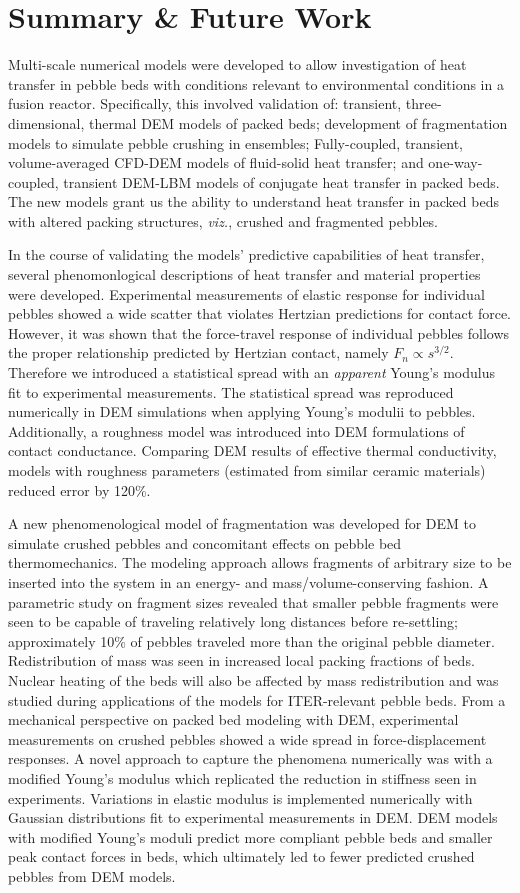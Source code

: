 \chapter{Summary \& Future Work}\label{sec:summary}
Multi-scale numerical models were developed to allow investigation of heat transfer in pebble beds with conditions relevant to environmental conditions in a fusion reactor. Specifically, this involved validation of: transient, three-dimensional, thermal DEM models of packed beds; development of fragmentation models to simulate pebble crushing in ensembles; Fully-coupled, transient, volume-averaged CFD-DEM models of fluid-solid heat transfer; and one-way-coupled, transient DEM-LBM models of conjugate heat transfer in packed beds. The new models grant us the ability to understand heat transfer in packed beds with altered packing structures, \textit{viz.}, crushed and fragmented pebbles. 

In the course of validating the models' predictive capabilities of heat transfer, several phenomonlogical descriptions of heat transfer and material properties were developed. Experimental measurements of elastic response for individual pebbles showed a wide scatter that violates Hertzian predictions for contact force. However, it was shown that the force-travel response of individual pebbles follows the proper relationship predicted by Hertzian contact, namely $F_n \propto s^{3/2}$. Therefore we introduced a statistical spread with an \textit{apparent} Young's modulus fit to experimental measurements. The statistical spread was reproduced numerically in DEM simulations when applying Young's modulii to pebbles. Additionally, a roughness model was introduced into DEM formulations of contact conductance. Comparing DEM results of effective thermal conductivity, models with roughness parameters (estimated from similar ceramic materials) reduced error by 120\%. 

A new phenomenological model of fragmentation was developed for DEM to simulate crushed pebbles and concomitant effects on pebble bed thermomechanics. The modeling approach allows fragments of arbitrary size to be inserted into the system in an energy- and mass/volume-conserving fashion. A parametric study on fragment sizes revealed that smaller pebble fragments were seen to be capable of traveling relatively long distances before re-settling; approximately 10\% of pebbles traveled more than the original pebble diameter. Redistribution of mass was seen in increased local packing fractions of beds. Nuclear heating of the beds will also be affected by mass redistribution and was studied during applications of the models for ITER-relevant pebble beds. From a mechanical perspective on packed bed modeling with DEM, experimental measurements on crushed pebbles showed a wide spread in force-displacement responses. A novel approach to capture the phenomena numerically was with a modified Young's modulus which replicated the reduction in stiffness seen in experiments. Variations in elastic modulus is implemented numerically with Gaussian distributions fit to experimental measurements in DEM. DEM models with modified Young's moduli predict more compliant pebble beds and smaller peak contact forces in beds, which ultimately led to fewer predicted crushed pebbles from DEM models.

